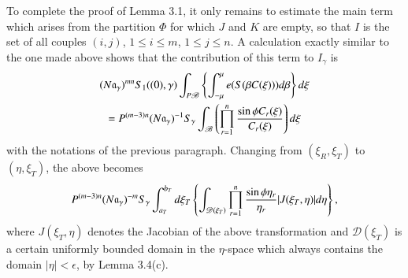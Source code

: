 To complete the proof of Lemma 3.1, it only remains to estimate the main term which arises from the partition $\Phi$ for which $J$ and $K$ are empty, so that $I$ is the set of all couples $(i, j)$, $1 \leq i \leq m$, $1 \leq j \leq n$. A calculation exactly similar to the one made above shows that the contribution of this term to $I_\gamma$ is
\begin{multline*}
(N\mathfrak{a}_\gamma)^{mn} S_1 ((0),\gamma) \int_{P\mathscr{B}} \left\{ \int^\mu_{-\mu} e (S (\beta C (\xi))) d \beta \right\} d \xi \\
= P^{(m-3) n} (N\mathfrak{a}_\gamma)^{-1} S_\gamma \int_{\mathscr{B}} \left(\prod\limits^{n}_{r=1} \dfrac{\sin \phi C_r (\xi)}{C_r (\xi)} \right) d \xi
\end{multline*}
 with the notations of the previous paragraph. Changing from $(\xi_R, \xi_T)$ to $(\eta, \xi_T)$, the above becomes
$$
P^{(m-3)n} (N\mathfrak{a}_\gamma)^{-m} S_\gamma \int^{b_T}_{a_T} d \xi_T \left\{ \int_{\mathscr{D} (\xi_T)} \prod\limits^{n}_{r=1} \dfrac{\sin \phi \eta_r}{\eta_r} |J(\xi_T, \eta)| d \eta \right\}, 
$$
where $J(\xi_T, \eta)$ denotes the Jacobian of the above transformation and $\mathscr{D}(\xi_T)$ is a certain uniformly bounded domain in the $\eta$-space which always contains the domain $|\eta| < \epsilon$, by Lemma 3.4(c).

